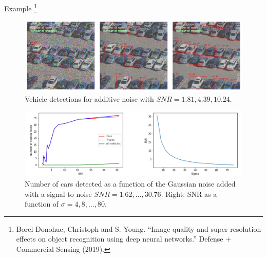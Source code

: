 \documentclass{libs/ufc_format}
\begin{document}
\begin{frame}{Example \footnote[frame]{\tiny Borel-Donohue, Christoph and S. Young. “Image quality and super resolution effects on object recognition using deep neural networks.” Defense + Commercial Sensing (2019).}}
    \begin{figure}
        \centering
        \includegraphics[scale=0.15]{libs/noiseeffect.png}
        \caption{Vehicle detections for additive noise with $SNR = {1.81, 4.39, 10.24}$.}
        \label{fig:challengenoise}
    \end{figure}
    
    \begin{figure}
        \centering
        \includegraphics[scale=0.15]{libs/noiseeffect2.png}
        \caption{Number of cars detected as a function of the Gaussian noise added with a signal to noise $SNR = {1.62,..., 30.76}$. Right: SNR as a function of $\sigma = {4, 8,..., 80}$.}
        \label{fig:challengenoise2}
    \end{figure}

\end{frame}
\end{document}
